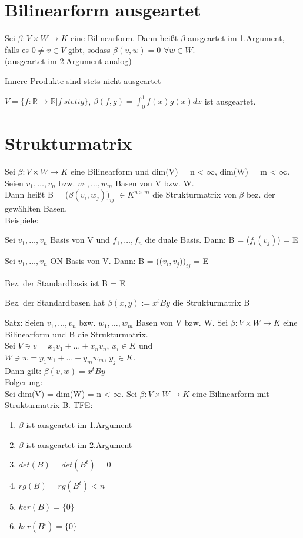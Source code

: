 \section{Bilinearform ausgeartet}
Sei $\beta: V \times W \to K$ eine Bilinearform. Dann heißt $\beta$ ausgeartet im 1.Argument, falls es $0 \neq v \in V$ gibt, sodass $\beta(v,w) = 0$ $\forall w \in W$.\\
(ausgeartet im 2.Argument analog)


\begin{remark}
\begin{compactitem}
\item Innere Produkte sind stets nicht-ausgeartet
\item $V = \{ f: \mathbb{R} \to \mathbb{R} | f~stetig \}$, $\beta(f,g) = \displaystyle\int_0^1 f(x) g(x) dx$ ist ausgeartet.
\end{compactitem}
\end{remark}

\section{Strukturmatrix}
Sei $\beta: V \times W \to K$ eine Bilinearform und dim(V) = n < $\infty$, dim(W) = m < $\infty$. Seien $v_1, …, v_n$ bzw. $w_1, …, w_m$ Basen von V bzw. W.\\
Dann heißt B = ($\beta(v_i, w_j))_{ij}$ $\in K^{n \times m}$ die Strukturmatrix von $\beta$ bez. der gewählten Basen.\\
Beispiele:
\begin{compactitem}
\item Sei $v_1, …, v_n$ Basis von V und $f_1, …, f_n$ die duale Basis. Dann: B = ($f_i(v_j)$) = E
\item Sei $v_1, …, v_n$ ON-Basis von V. Dann: B = (($v_i, v_j))_{ij}$ = E
\item Bez. der Standardbasis ist B = E
\item Bez. der Standardbasen hat $\beta(x,y) := x^tBy$ die Strukturmatrix B
\end{compactitem}
Satz: Seien $v_1, …, v_n$ bzw. $w_1, …, w_m$ Basen von V bzw. W. Sei $\beta: V \times W \to K$ eine Bilinearform und B die Strukturmatrix.\\
Sei $V \ni v = x_1v_1 + … + x_nv_n$, $x_i \in K$ und\\
\hspace*{4mm} $W \ni w = y_1w_1 + … + y_mw_m$, $y_j \in K$.\\
Dann gilt: $\beta(v, w) = x^tBy$\\
Folgerung:\\
Sei dim(V) = dim(W) = n < $\infty$. Sei $\beta: V \times W \to K$ eine Bilinearform mit Strukturmatrix B. TFE:
\begin{enumerate}
\item $\beta$ ist ausgeartet im 1.Argument
\item $\beta$ ist ausgeartet im 2.Argument
\item $det(B) = det(B^t) = 0$
\item $rg(B) = rg(B^t) < n$
\item $ker(B) = \{0\}$
\item $ker(B^t) = \{0\}$
\end{enumerate}
